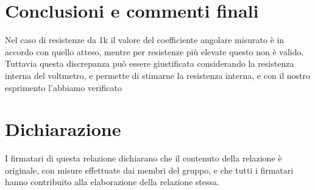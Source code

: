 \documentclass[10pt,a4paper]{article}
\begin{document}
\section{Conclusioni e commenti finali}
Nel caso di resistenze da 1k il valore del coefficiente angolare misurato è in accordo con quello atteso, mentre per resistenze più elevate questo non è valido. Tuttavia questa discrepanza può essere giustificata considerando la resistenza interna del voltmetro, e permette di stimarne la resistenza interna, e con il nostro esprimento l'abbiamo verificato

\section*{Dichiarazione}
I firmatari di questa relazione dichiarano che il contenuto della relazione \`e originale, con misure effettuate dai membri del gruppo, e che tutti i firmatari hanno contribuito alla elaborazione della relazione stessa.
\end{document}
